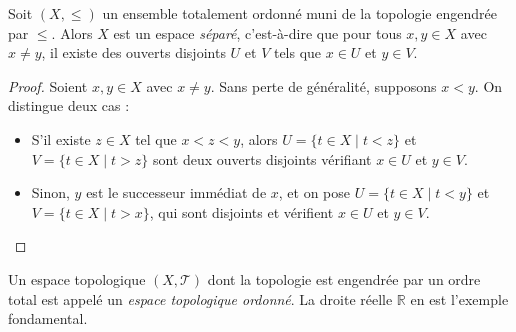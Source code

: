 \begin{proposition}
Soit $(X, \leq)$ un ensemble totalement ordonné muni de la topologie engendrée par $\leq$. Alors $X$ est un espace \emph{séparé}, c'est-à-dire que pour tous $x, y \in X$ avec $x \neq y$, il existe des ouverts disjoints $U$ et $V$ tels que $x \in U$ et $y \in V$.
\end{proposition}

\begin{proof}
Soient $x, y \in X$ avec $x \neq y$. Sans perte de généralité, supposons $x < y$. On distingue deux cas :
\begin{itemize}
    \item S'il existe $z \in X$ tel que $x < z < y$, alors $U = \{t \in X \mid t < z\}$ et $V = \{t \in X \mid t > z\}$ sont deux ouverts disjoints vérifiant $x \in U$ et $y \in V$.
    \item Sinon, $y$ est le successeur immédiat de $x$, et on pose $U = \{t \in X \mid t < y\}$ et $V = \{t \in X \mid t > x\}$, qui sont disjoints et vérifient $x \in U$ et $y \in V$. 
\end{itemize}
\end{proof}

\begin{remarque}
    Un espace topologique $(X, \mathcal{T})$ dont la topologie est engendrée par un ordre total est appelé un \emph{espace topologique ordonné}. La droite réelle $\mathbb{R}$ en est l'exemple fondamental.
\end{remarque}


